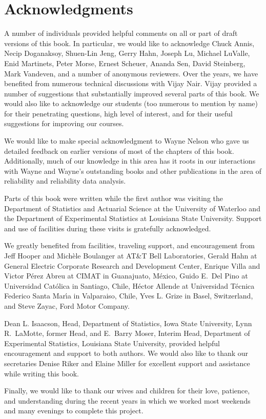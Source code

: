 \chapter*{Acknowledgments}

A number of individuals provided helpful comments on all or part of
draft versions of this book.  In particular, we would like to
acknowledge Chuck Annis, Necip Doganaksoy, Shuen-Lin Jeng, Gerry
Hahn, Joseph Lu, Michael LuValle, Enid Martinets, Peter Morse,
Ernest Scheuer, Ananda Sen, David Steinberg, Mark Vandeven, and a
number of anonymous reviewers.  Over the years, we have benefited
from numerous technical discussions with Vijay Nair. Vijay provided
a number of suggestions that substantially improved several parts of
this book. We would also like to acknowledge our students (too
numerous to mention by name) for their penetrating questions, high
level of interest, and for their useful suggestions for improving
our courses.

We would like to make special acknowledgment to Wayne Nelson who
gave us detailed feedback on earlier versions of most of the
chapters of this book.  Additionally, much of our knowledge in this
area has it roots in our interactions with Wayne and Wayne's
outstanding books and other publications in the area of reliability
and reliability data analysis.

Parts of this book were written while the first author was visiting
the Department of Statistics and Actuarial Science at the University
of Waterloo and the Department of Experimental Statistics at
Louisiana State University. Support and use of facilities during these
visits is gratefully acknowledged.

We greatly benefited from facilities, traveling support, and
encouragement from Jeff Hooper and Mich\`{e}le Boulanger at AT\&T Bell
Laboratories, Gerald Hahn at General Electric Corporate Research and
Development Center, Enrique Villa and Victor P\'{e}rez Abreu at CIMAT
in Guanajuato, M\'{e}xico, Guido E.\ Del Pino at Universidad
Cat\'{o}lica in Santiago, Chile, H\'{e}ctor Allende at Universidad
T\'{e}cnica Federico Santa Mar\'{\i}a in Valparaiso, Chile, Yves L.
Grize in Basel, Switzerland, and Steve Zayac, Ford Motor Company.

Dean L. Isaacson, Head, Department of Statistics, Iowa State
University, Lynn  R.\ LaMotte, former Head, and E.\ Barry Moser,
Interim Head, Department of Experimental Statistics, Louisiana State
University, provided helpful encouragement and support to both
authors. We would also like to thank our secretaries Denise Riker
and Elaine Miller for excellent support and assistance while writing
this book.

Finally, we would like to thank our wives and children for their
love, patience, and understanding during the recent years in which
we worked most weekends and many evenings to complete this project.





